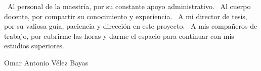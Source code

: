 \hfill\break\ Al personal de la maestría, por su constante apoyo administrativo.
\hfill\break\ Al cuerpo docente, por compartir su conocimiento y experiencia.
\hfill\break\ A mi director de tesis, por su valiosa guía, paciencia y dirección en este proyecto.
\hfill\break\ A mis compañeros de trabajo, por cubrirme las horas y darme el espacio para continuar con mis  estudios superiores.


\vspace{5cm}
\begin{flushright}
Omar Antonio Vélez Bayas
\end{flushright}